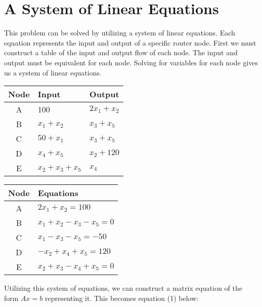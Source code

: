 \documentclass[paper.tex]{subfiles}
\begin{document}
\section{A System of Linear Equations}

This problem can be solved by utilizing a system of linear equations.
Each equation represents the input and output of a specific router node.
First we must construct a table of the input and output flow of each node.
The input and output must be equivalent for each node.
Solving for variables for each node gives us a system of linear equations.

\begin{center}
\begin{tabular}{c | l | l}

    \textbf{Node} & \textbf{Input} & \textbf{Output} \\ \hline

    A & 100                         & $2x_1 + x_2$ \\
    B & $x_1 + x_2$                 & $x_3 + x_5$  \\
    C & $50 + x_1$                  & $x_3 + x_5$  \\
    D & $x_4 + x_5$                 & $x_2 + 120$  \\
    E & $x_2 + x_3 + x_5$ \hspace{8mm} & $x_4$                         
    
\end{tabular}


\begin{tabular}{c | l}
    \textbf{Node} & \textbf{Equations} \\ \hline
    A & $2x_1 + x_2 = 100$ \\
    B & $x_1 + x_2 - x_3 - x_5 = 0$    \\
    C & $x_1 - x_3 - x_5 = -50$        \\
    D & $-x_2 + x_4 + x_5 = 120$       \\
    E & $x_2 + x_3 - x_4 + x_5 = 0$
\end{tabular}
\end{center}

Utilizing this system of equations, we can construct a matrix equation of the form $Ax = b$ representing it.
This becomes equation (1) below:
\end{document}
